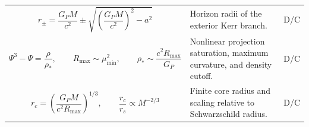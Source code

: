 \documentclass[11pt]{article}
\begin{document}
\begin{longtable}{>{\raggedright\arraybackslash}p{} >{\raggedright\arraybackslash}p{} >{\centering\arraybackslash}p{}}
\begin{equation}
r_\pm=\frac{G_PM}{c^2}\pm\sqrt{\left(\frac{G_PM}{c^2}\right)^2-a^2}
\end{equation}
& Horizon radii of the exterior Kerr branch. & D/C \\

\begin{equation}
\Psi^3-\Psi=\frac{\rho}{\rho_*},
\qquad
R_{\max}\sim\mu_{\min}^2,
\qquad
\rho_*\sim\frac{c^2R_{\max}}{G_P}
\end{equation}
& Nonlinear projection saturation, maximum curvature, and density cutoff. & D/C \\

\begin{equation}
r_c=\left(\frac{G_PM}{c^2R_{\max}}\right)^{1/3},
\qquad
\frac{r_c}{r_s}\propto M^{-2/3}
\end{equation}
& Finite core radius and scaling relative to Schwarzschild radius. & D/C \\

\bottomrule
\end{longtable}
\end{document}
